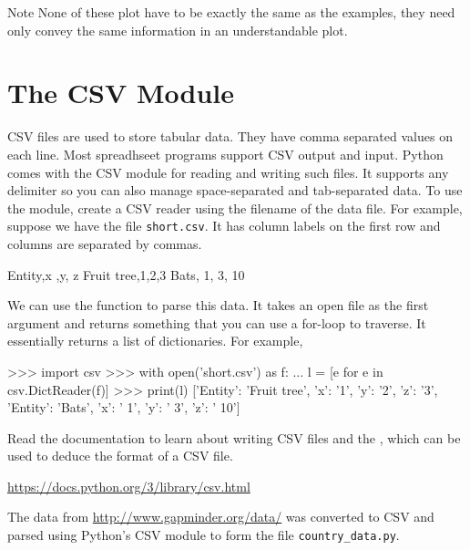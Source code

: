 \documentclass[11pt]{cselabheader}
\begin{document}
\begin{infobox}{Note}
None of these plot have to be exactly the same as the examples, they need only convey the same information in an understandable plot.
\end{infobox}

\section{The CSV Module}
CSV files are used to store tabular data. They have comma separated values on
each line. Most spreadhseet programs support CSV output and input. Python comes
with the CSV module for reading and writing such files. It supports any
delimiter so you can also manage space-separated and tab-separated data. To
use the module, create a CSV reader using the filename of the data file. For
example, suppose we have the file \texttt{short.csv}. It has column labels
on the first row and columns are separated by commas.

\begin{verbatimcode}
Entity,x         ,y,  z
Fruit tree,1,2,3
Bats, 1, 3, 10
\end{verbatimcode}

We can use the  function to parse this data.
It takes an open file as the first argument and returns something that you
can use a for-loop to traverse. It essentially returns a list of dictionaries.
For example,

\begin{pyconcode}
>>> import csv
>>> with open('short.csv') as f:
...     l = [e for e in csv.DictReader(f)]
>>> print(l)
[{'Entity': 'Fruit tree', 'x': '1', 'y': '2', 'z': '3'},
 {'Entity': 'Bats', 'x': ' 1', 'y': ' 3', 'z': ' 10'}]
\end{pyconcode}

Read the documentation to learn about writing CSV files and the
, which can be used to deduce the format of
a CSV file.

\begin{center}
\url{https://docs.python.org/3/library/csv.html}
\end{center}

The data from \url{http://www.gapminder.org/data/} was converted to CSV and
parsed using Python's CSV module to form the file \texttt{country\_data.py}. 
\end{document}
